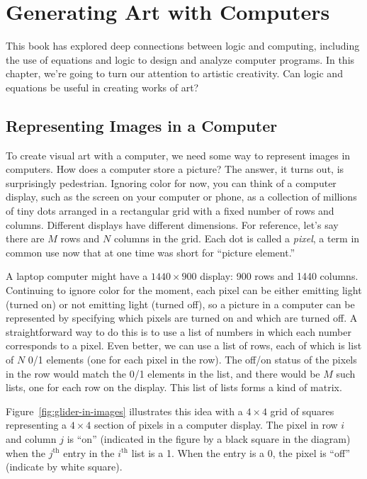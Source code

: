 \chapter{Generating Art with Computers}
\label{ch:art-computers}

This book has explored deep connections between logic
and computing, including the use of equations and logic to
design and analyze computer programs. In this chapter, we're going
to turn our attention to artistic creativity. Can logic and
equations be useful in creating works of art?

\section{Representing Images in a Computer}

To create visual art with a computer, we need some way to
represent images in computers. How does a computer
store a picture?
The answer, it turns out, is surprisingly pedestrian. Ignoring
color for now, you can think of a computer display, such as the
screen on your computer or phone, as a collection of millions
of tiny dots arranged in a rectangular grid with a fixed number
of rows and columns. Different displays have different dimensions.
For reference, let's say there are $M$ rows and $N$ columns
in the grid.
Each dot is called a \emph{pixel}, a term in common use now
that at one time was short for ``picture element.''

A laptop computer might have
a $1440\times900$ display: 900 rows and 1440 columns.
Continuing to ignore color for the moment, each pixel can
be either emitting light (turned on) or not emitting light
(turned off), so a picture in a computer can be represented
by specifying which pixels are turned on and which are turned off.
A straightforward way to do this is to use a list of
numbers in which each number corresponds to a pixel. Even better,
we can use a list of rows, each of which is list of $N$
0/1 elements (one for each pixel in the row).
The off/on status of the pixels in the row would
match the 0/1 elements in the list,
and there would be $M$ such lists, one for each row on the display.
This list of lists forms a kind of matrix.

Figure~\ref{fig:glider-in-images} illustrates
this idea with a $4\times4$ grid of squares
representing a $4\times4$ section of pixels in a computer display.
The pixel in row $i$ and column $j$ is ``on''
(indicated in the figure by a black square in the diagram)
when the $j^\text{th}$
entry in the $i^\text{th}$ list is a 1.
When the entry is a 0, the pixel is ``off'' (indicate by white square).


